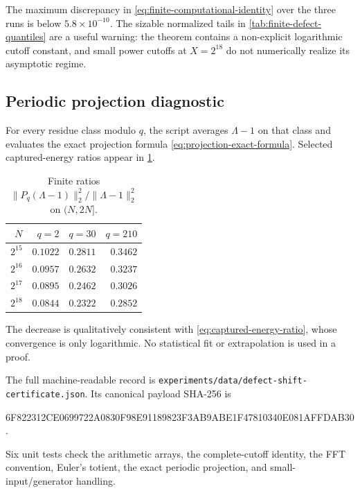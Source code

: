 The maximum discrepancy in \eqref{eq:finite-computational-identity} over
the three runs is below $5.8\times10^{-10}$.  The sizable normalized tails
in \cref{tab:finite-defect-quantiles} are a useful warning: the theorem
contains a non-explicit logarithmic cutoff constant, and small power cutoffs
at $X=2^{18}$ do not numerically realize its asymptotic regime.

\subsection{Periodic projection diagnostic}
\label{subsec:periodic-projection-diagnostic}

For every residue class modulo $q$, the script averages $\Lambda-1$ on that
class and evaluates the exact projection formula
\eqref{eq:projection-exact-formula}.  Selected captured-energy ratios appear
in \cref{tab:finite-periodic-energy}.

\begin{table}[ht]
\centering
\caption{Finite ratios
$\|P_q(\Lambda-1)\|_2^2/\|\Lambda-1\|_2^2$ on $(N,2N]$.}
\label{tab:finite-periodic-energy}
\begin{tabular}{@{}rrrr@{}}
\toprule
$N$ & $q=2$ & $q=30$ & $q=210$ \\
\midrule
$2^{15}$ & $0.1022$ & $0.2811$ & $0.3462$ \\
$2^{16}$ & $0.0957$ & $0.2632$ & $0.3237$ \\
$2^{17}$ & $0.0895$ & $0.2462$ & $0.3026$ \\
$2^{18}$ & $0.0844$ & $0.2322$ & $0.2852$ \\
\bottomrule
\end{tabular}
\end{table}

The decrease is qualitatively consistent with
\eqref{eq:captured-energy-ratio}, whose convergence is only logarithmic.
No statistical fit or extrapolation is used in a proof.

\begin{samepage}
The full machine-readable record is
\texttt{experiments/data/defect-shift-certificate.json}.  Its canonical
payload SHA-256 is
\begin{center}
\small\ttfamily
6F822312CE0699722A0830F98E91189823F3AB9ABE1F47810340E081AFFDAB30.
\end{center}
Six unit tests check the arithmetic arrays, the complete-cutoff identity,
the FFT convention, Euler's totient, the exact periodic projection, and
small-input/generator handling.
\end{samepage}

